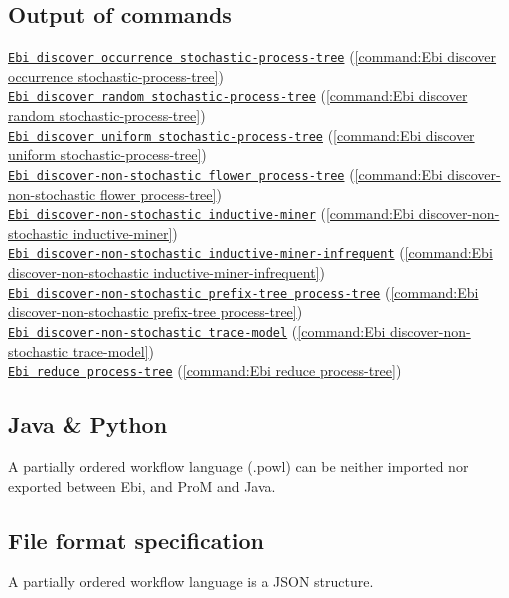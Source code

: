 {\subsection*{Output of commands} \null\qquad\hyperref[command:Ebi discover occurrence stochastic-process-tree]{\texttt{Ebi discover occurrence stochastic-process-tree}} (\cref{command:Ebi discover occurrence stochastic-process-tree})\\\null\qquad\hyperref[command:Ebi discover random stochastic-process-tree]{\texttt{Ebi discover random stochastic-process-tree}} (\cref{command:Ebi discover random stochastic-process-tree})\\\null\qquad\hyperref[command:Ebi discover uniform stochastic-process-tree]{\texttt{Ebi discover uniform stochastic-process-tree}} (\cref{command:Ebi discover uniform stochastic-process-tree})\\\null\qquad\hyperref[command:Ebi discover-non-stochastic flower process-tree]{\texttt{Ebi discover-non-stochastic flower process-tree}} (\cref{command:Ebi discover-non-stochastic flower process-tree})\\\null\qquad\hyperref[command:Ebi discover-non-stochastic inductive-miner]{\texttt{Ebi discover-non-stochastic inductive-miner}} (\cref{command:Ebi discover-non-stochastic inductive-miner})\\\null\qquad\hyperref[command:Ebi discover-non-stochastic inductive-miner-infrequent]{\texttt{Ebi discover-non-stochastic inductive-miner-infrequent}} (\cref{command:Ebi discover-non-stochastic inductive-miner-infrequent})\\\null\qquad\hyperref[command:Ebi discover-non-stochastic prefix-tree process-tree]{\texttt{Ebi discover-non-stochastic prefix-tree process-tree}} (\cref{command:Ebi discover-non-stochastic prefix-tree process-tree})\\\null\qquad\hyperref[command:Ebi discover-non-stochastic trace-model]{\texttt{Ebi discover-non-stochastic trace-model}} (\cref{command:Ebi discover-non-stochastic trace-model})\\\null\qquad\hyperref[command:Ebi reduce process-tree]{\texttt{Ebi reduce process-tree}} (\cref{command:Ebi reduce process-tree})
\subsection*{Java \& Python}
A partially ordered workflow language (.powl) can be neither imported nor exported between Ebi, and ProM and Java.
\subsection*{File format specification}A partially ordered workflow language is a JSON structure.
        
}
